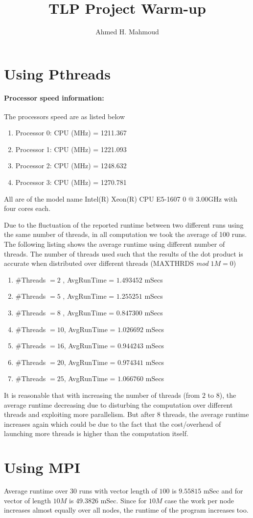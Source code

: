 \documentclass[12pt] {article}
\begin{document}
\title{TLP Project Warm-up}
\author{Ahmed H. Mahmoud}
\date{}
\maketitle

\section{Using Pthreads}
\paragraph{Processor speed information:} The processors speed are as listed below
\begin{enumerate}
\item Processor 0: CPU (MHz) = 1211.367
\item Processor 1: CPU (MHz) = 1221.093
\item Processor 2: CPU (MHz) = 1248.632
\item Processor 3: CPU (MHz) = 1270.781
\end{enumerate}
All are of the model name Intel(R) Xeon(R) CPU E5-1607 0 @ 3.00GHz with four cores each.

Due to the fluctuation of the reported runtime between two different runs using the same number of threads, in all computation we took the average of 100 runs. The following listing shows the average runtime using different number of threads. The number of threads used such that the results of the dot product is accurate when distributed over different threads (MAXTHRDS \emph{mod} $1M=0$)

\begin{enumerate}
\item $\#$Threads $=2$ , AvgRunTime = $1.493452$ mSecs
\item $\#$Threads $=5$ , AvgRunTime = $1.255251$ mSecs
\item $\#$Threads $=8$ , AvgRunTime = $0.847300$ mSecs
\item $\#$Threads $=10$, AvgRunTime = $1.026692$ mSecs
\item $\#$Threads $=16$, AvgRunTime = $0.944243$ mSecs
\item $\#$Threads $=20$, AvgRunTime = $0.974341$ mSecs
\item $\#$Threads $=25$, AvgRunTime = $1.066760$ mSecs
\end{enumerate}
It is reasonable that with increasing the number of threads (from $2$ to $8$), the average runtime decreasing due to disturbing the computation over different threads and exploiting more parallelism. But after 8 threads, the average runtime increases again which could be due to the fact that the cost/overhead of launching more threads is higher than the computation itself.
 
\section{Using MPI}
Average runtime over $30$ runs with vector length of $100$ is $9.55815$ mSec and for vector of length $10M$ is $49.3826$ mSec. Since for $10M$ case the work per node increases almost equally over all nodes, the runtime of the program increases too.
\end{document}
